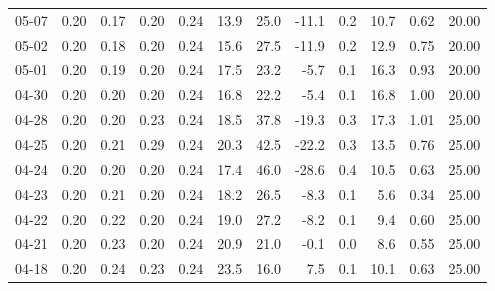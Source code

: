 \begin{threeparttable}
{\begin{tabular}{lrrrrrrrrrrr}
  05-07 &          0.20 &          0.17 &          0.20 &        0.24 &                13.9 &                25.0 &      -11.1 &                 0.2 &             10.7 &            0.62 &                  20.00 \\
  05-02 &          0.20 &          0.18 &          0.20 &        0.24 &                15.6 &                27.5 &      -11.9 &                 0.2 &             12.9 &            0.75 &                  20.00 \\
  05-01 &          0.20 &          0.19 &          0.20 &        0.24 &                17.5 &                23.2 &       -5.7 &                 0.1 &             16.3 &            0.93 &                  20.00 \\
  04-30 &          0.20 &          0.20 &          0.20 &        0.24 &                16.8 &                22.2 &       -5.4 &                 0.1 &             16.8 &            1.00 &                  20.00 \\
  04-28 &          0.20 &          0.20 &          0.23 &        0.24 &                18.5 &                37.8 &      -19.3 &                 0.3 &             17.3 &            1.01 &                  25.00 \\
  04-25 &          0.20 &          0.21 &          0.29 &        0.24 &                20.3 &                42.5 &      -22.2 &                 0.3 &             13.5 &            0.76 &                  25.00 \\
  04-24 &          0.20 &          0.20 &          0.20 &        0.24 &                17.4 &                46.0 &      -28.6 &                 0.4 &             10.5 &            0.63 &                  25.00 \\
  04-23 &          0.20 &          0.21 &          0.20 &        0.24 &                18.2 &                26.5 &       -8.3 &                 0.1 &              5.6 &            0.34 &                  25.00 \\
  04-22 &          0.20 &          0.22 &          0.20 &        0.24 &                19.0 &                27.2 &       -8.2 &                 0.1 &              9.4 &            0.60 &                  25.00 \\
  04-21 &          0.20 &          0.23 &          0.20 &        0.24 &                20.9 &                21.0 &       -0.1 &                 0.0 &              8.6 &            0.55 &                  25.00 \\
  04-18 &          0.20 &          0.24 &          0.23 &        0.24 &                23.5 &                16.0 &        7.5 &                 0.1 &             10.1 &            0.63 &                  25.00 \\

\end{tabular}}
\end{threeparttable}
